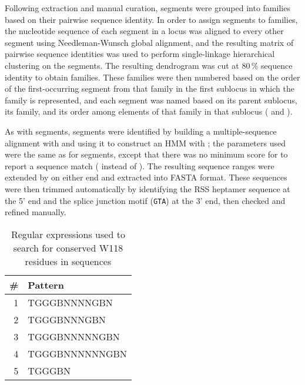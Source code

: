 Following extraction and manual curation, \vh segments were grouped into families based on their pairwise sequence identity. In order to assign segments to families, the nucleotide sequence of each \vh segment in a locus was aligned to every other segment using Needleman-Wunsch global alignment, and the resulting matrix of pairwise sequence identities was used to perform single-linkage hierarchical clustering on the \vh segments. The resulting dendrogram was cut at 80\,\% sequence identity to obtain \vh families. These families were then numbered based on the order of the first-occurring \vh segment from that family in the first \igh{} sublocus in which the family is represented, and each \vh segment was named based on its parent sublocus, its family, and its order among elements of that family in that sublocus ( and ).

\subsubsubsection{\jh}

\noindent As with \vh segments, \jh segments were identified by building a multiple-sequence alignment with  and using it to construct an HMM with ; the parameters used were the same as for \vh segments, except that there was no minimum score for  to report a sequence match ( instead of ). The resulting sequence ranges were extended by  on either end and extracted into FASTA format. These sequences were then trimmed automatically by identifying the RSS heptamer sequence at the 5' end and the splice junction motif (\texttt{GTA}) at the 3' end, then checked and refined manually.

\begin{wraptable}{r}{6.5cm}
\caption{Regular expressions used to search for conserved W118 residues in \jh sequences}\label{tab:jh-aux-patterns}
\begin{tabular}{r>{\ttseries}l}\toprule  
\# & Pattern \\\midrule
1 & TGGGBNNNNGBN\\
2 & TGGGBNNNGBN\\
3 & TGGGBNNNNNGBN\\
4 & TGGGBNNNNNNGBN\\
5 & TGGGBN\\\bottomrule
\end{tabular}
\end{wraptable}

